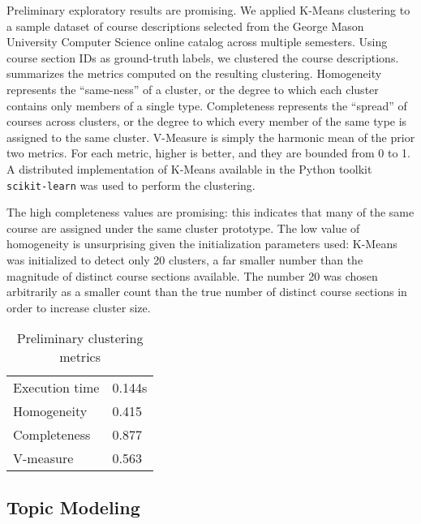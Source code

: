 
Preliminary exploratory results are promising.
We applied K-Means clustering to a sample dataset of course descriptions selected from the George Mason University Computer Science online catalog across multiple semesters.
Using course section IDs as ground-truth labels, we clustered the course descriptions.
 summarizes the metrics computed on the resulting clustering.
Homogeneity represents the ``same-ness'' of a cluster, or the degree to which each cluster contains only members of a single type.
Completeness represents the ``spread'' of courses across clusters, or the degree to which every member of the same type is assigned to the same cluster.
V-Measure is simply the harmonic mean of the prior two metrics.
For each metric, higher is better, and they are bounded from 0 to 1.
A distributed implementation of K-Means available in the Python toolkit \texttt{scikit-learn} was used to perform the clustering.


The high completeness values are promising: this indicates that many of the same course are assigned under the same cluster prototype.
The low value of homogeneity is unsurprising given the initialization parameters used: K-Means was initialized to detect only 20 clusters, a far smaller number than the magnitude of distinct course sections available.
The number 20 was chosen arbitrarily as a smaller count than the true number of distinct course sections in order to increase cluster size.


\begin{table}[ht]
\centering
\begin{tabular}{ll}
\toprule
Execution time & 0.144s \\
Homogeneity & 0.415 \\
Completeness & 0.877 \\
V-measure & 0.563 \\
\bottomrule
\end{tabular}
\caption{Preliminary clustering metrics\label{table:cluster-metrics}}
\end{table}


\subsection{Topic Modeling}
\label{sec:topic-modeling}

